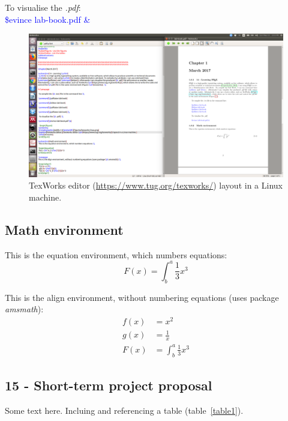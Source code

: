 \documentclass[12pt, a4paper]{report}
\newcommand{\command}[1]{\textcolor{blue}{#1}}
\begin{document}
   To visualise the {\it .pdf}: \\
  
  \command{\$evince lab-book.pdf \&}
  
    \begin{figure}
  \centering 
  \includegraphics[width=1.0\textwidth]{figures/texworks-linux.png} 
  \caption[TexWorks Editor.]{TexWorks editor (\url{https://www.tug.org/texworks/}) layout in a Linux machine.}
  \label{texworks} 
  \end{figure}
  
 \subsection{Math environment}
  This is the equation environment, which numbers equations: \\
  
  \begin{equation}
  F(x) = \int^a_b \frac{1}{3}x^3
 \end{equation}
 
  \newpage
 This is the align environment, without numbering equations (uses package {\it amsmath}): \\
 
  \begin{align*}
   f(x) &= x^2\\
   g(x) &= \frac{1}{x}\\
   F(x) &= \int^a_b \frac{1}{3}x^3
 \end{align*}
 
  \subsection{15 - Short-term project proposal}
 Some text here. Incluing and referencing a table (table~\ref{table1}).
 
\end{document}
